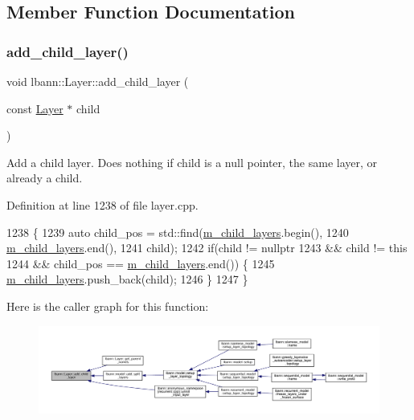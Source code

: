 \subsection{Member Function Documentation}
\mbox{\label{classlbann_1_1Layer_ace0346ac56fd7ce7b6b44f27f224f35e}} 
\subsubsection{\texorpdfstring{add\+\_\+child\+\_\+layer()}{add\_child\_layer()}}
{\footnotesize\ttfamily void lbann\+::\+Layer\+::add\+\_\+child\+\_\+layer (\begin{DoxyParamCaption}\item[{const \hyperlink{classlbann_1_1Layer}{Layer} $\ast$}]{child }\end{DoxyParamCaption})}

Add a child layer. Does nothing if child is a null pointer, the same layer, or already a child. 

Definition at line 1238 of file layer.\+cpp.


\begin{DoxyCode}
1238                                               \{
1239   \textcolor{keyword}{auto} child\_pos = std::find(\hyperlink{classlbann_1_1Layer_ae348c0d2b4d05f74d809d09debb633c0}{m\_child\_layers}.begin(),
1240                              \hyperlink{classlbann_1_1Layer_ae348c0d2b4d05f74d809d09debb633c0}{m\_child\_layers}.end(),
1241                              child);
1242   \textcolor{keywordflow}{if}(child != \textcolor{keyword}{nullptr}
1243      && child != \textcolor{keyword}{this}
1244      && child\_pos == \hyperlink{classlbann_1_1Layer_ae348c0d2b4d05f74d809d09debb633c0}{m\_child\_layers}.end()) \{
1245     \hyperlink{classlbann_1_1Layer_ae348c0d2b4d05f74d809d09debb633c0}{m\_child\_layers}.push\_back(child);
1246   \}
1247 \}
\end{DoxyCode}
Here is the caller graph for this function\+:\nopagebreak
\begin{figure}[H]
\begin{center}
\leavevmode
\includegraphics[width=350pt]{classlbann_1_1Layer_ace0346ac56fd7ce7b6b44f27f224f35e_icgraph}
\end{center}
\end{figure}
\mbox{\label{classlbann_1_1Layer_a326668ce624a9bcc719a463820b2e3a4}} 
